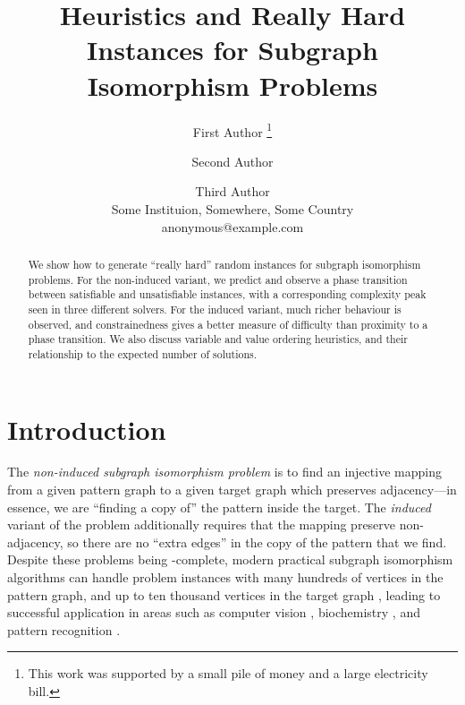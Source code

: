 \documentclass[letterpaper]{article}
\title{Heuristics and Really Hard Instances for Subgraph Isomorphism Problems}
\author{First Author \thanks{This work was supported by a small pile of money and a large
    electricity bill.} \and Second Author
    \and Third Author \\
Some Instituion, Somewhere, Some Country \\
anonymous@example.com}
\begin{document}
\maketitle

\begin{abstract}
    We show how to generate ``really hard'' random instances for subgraph isomorphism problems. For
    the non-induced variant, we predict and observe a phase transition between satisfiable and
    unsatisfiable instances, with a corresponding complexity peak seen in three different solvers. For
    the induced variant, much richer behaviour is observed, and constrainedness gives
    a better measure of difficulty than proximity to a phase transition. We also discuss variable
    and value ordering heuristics, and their relationship to the expected number of solutions.
\end{abstract}

\section{Introduction}

The \emph{non-induced subgraph isomorphism problem} is to find an injective mapping from a given
pattern graph to a given target graph which preserves adjacency---in essence, we are ``finding a
copy of'' the pattern inside the target. The \emph{induced} variant of the problem additionally
requires that the mapping preserve non-adjacency, so there are no ``extra edges'' in the copy of the
pattern that we find. %
Despite these problems being \NP-complete, modern practical subgraph isomorphism algorithms can
handle problem instances with many hundreds of vertices in the pattern graph, and up to ten thousand
vertices in the target graph \citep{Cordella:2004,Solnon:2010,Audemard:2014,McCreesh:2015}, leading
to successful application in areas such as computer
vision \citep{Damiand:2011,Solnon:2015}, biochemistry \citep{Giugno:2013,Carletti:2015}, and pattern
recognition \citep{Conte:2004}.
\end{document}
